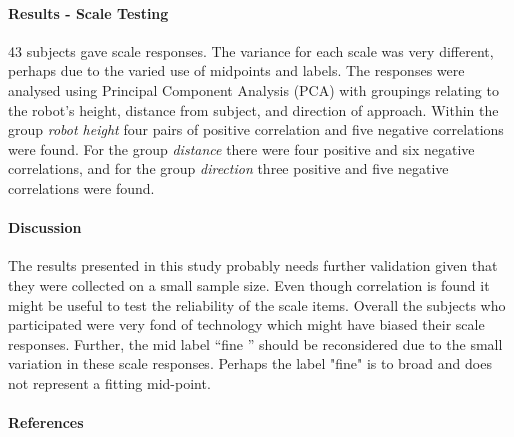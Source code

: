 \documentclass[a4paper]{article}
\begin{document}
\paragraph{Results - Scale Testing}
43 subjects gave scale responses. The variance for each scale was very different, perhaps due to the varied use of midpoints and labels. The responses were analysed using Principal Component Analysis (PCA) with groupings relating to the robot's height, distance from subject, and direction of approach. Within the group \textit{robot height} four pairs of positive correlation and five negative correlations were found. For the group \textit{distance} there were four positive and six negative correlations, and for the group \textit{direction} three positive and five negative correlations were found. 

\paragraph{Discussion}
The results presented in this study probably needs further validation given that they were collected on a small sample size. Even though correlation is found it might be useful to test the reliability of the scale items. Overall the subjects who participated were very fond of technology which might have biased their scale responses. Further, the mid label ``fine '' should be reconsidered due to the small variation in these scale responses. Perhaps the label "fine" is to broad and does not represent a fitting mid-point. 

\paragraph{References}
\end{document}
